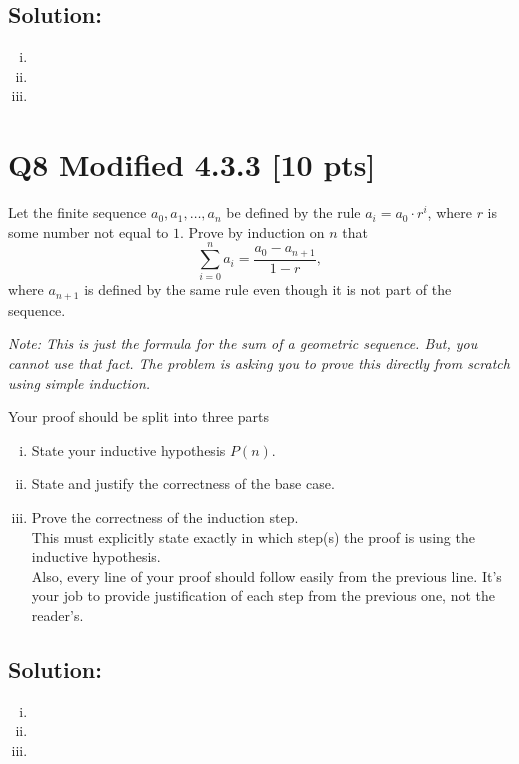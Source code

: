 \documentclass[12pt]{article}
\begin{document}
\subsection*{\textbf{Solution:}}
\begin{enumerate}[(i)]
    \item 
    \item 
    \item 
\end{enumerate}





\newpage

\section*{Q8  Modified 4.3.3 [10 pts]}

Let the finite sequence   $a_0,a_1,\ldots,a_n$ be defined by the rule $a_i = a_0 \cdot r^i$, where $r$ is some number not equal to $1.$
Prove by induction on $n$ that 
$$\sum_{i=0}^n a_i =  \frac {a_0- a_{n+1}} {1-r},
$$
where $a_{n+1}$ is defined by the same rule even though it is not part of the sequence.

\medskip


{\em \small Note:  This is just the formula for the sum of a geometric sequence. But, you cannot use that fact.  The problem is asking you to prove this directly from scratch using simple induction.}

\medskip

Your proof should be split into three parts
\begin{enumerate}[(i)]
    \item State your inductive hypothesis $P(n).$ 
    \item State and justify the correctness of the base case.
    \item Prove the correctness of the induction step. \\This must explicitly state exactly  in which step(s) the proof   is using the inductive hypothesis.\\
    Also, every line of your proof should follow easily from the previous line. It's your job to provide justification of each step from the previous one,  not the reader's.  
\end{enumerate}


\subsection*{\textbf{Solution:}}
\begin{enumerate}[(i)]
    \item 
    \item 
    \item 
\end{enumerate}
\end{document}
